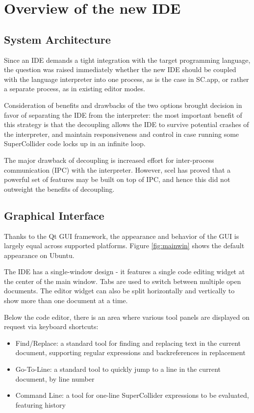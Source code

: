 \documentclass[11pt,a4paper]{article}
\begin{document}
\section{Overview of the new IDE}

\subsection{System Architecture}

Since an IDE demands a tight integration with the target programming language, the question was
raised immediately whether the new IDE should be coupled with the language interpreter into one
process, as is the case in SC.app, or rather a separate process, as in existing editor modes.

Consideration of benefits and drawbacks of the two options brought decision in favor of
separating the IDE from the interpreter: the most important benefit of this strategy is that the
decoupling allows the IDE to survive potential crashes of the interpreter, and maintain
responsiveness and control in case running some SuperCollider code locks up in an infinite loop.

The major drawback of decoupling is increased effort for inter-process communication (IPC) with the
interpreter. However, scel has proved that a powerful set of features may be built on top of IPC,
and hence this did not outweight the benefits of decoupling.

\subsection{Graphical Interface}
\label{gui}

Thanks to the Qt GUI framework, the appearance and behavior of the GUI is largely equal across supported platforms.
Figure \ref{fig:mainwin} shows the default appearance on Ubuntu.

The IDE has a single-window design - it features a single code editing widget at the center of the main window. Tabs are
used to switch between multiple open documents. The editor widget can also be split horizontally and vertically to show
more than one document at a time.

Below the code editor, there is an area where various tool panels are displayed on request via keyboard shortcuts:
\begin{itemize}
  \item Find/Replace: a standard tool for finding and replacing text in the current document, supporting regular
expressions and backreferences in replacement
  \item Go-To-Line: a standard tool to quickly jump to a line in the current document, by line number
  \item Command Line: a tool for one-line SuperCollider expressions to be evaluated, featuring history
\end{itemize}
\end{document}

